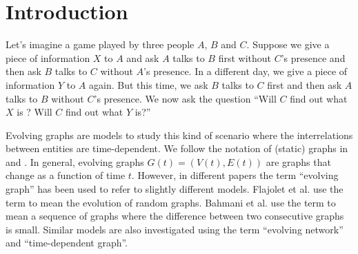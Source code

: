 \documentclass[11pt, conference, , compsocconf]{IEEEtran}
\theoremstyle{definition}
\begin{document}
\section{Introduction}

Let's imagine a game played by three people $A$, $B$ and $C$.
Suppose we give a piece of information $X$ to $A$ and ask 
$A$ talks to $B$ first without $C$'s presence and then ask $B$ talks to $C$ without $A$'s presence.
In a different day, we give a piece of information $Y$ to $A$ again.
But this time, we ask $B$ talks to $C$ first and 
then ask $A$ talks to $B$ without $C$'s presence. 
We now ask the question ``Will $C$ find out what $X$ is ? Will $C$ find out
what $Y$ is?''  

Evolving graphs are models to study this kind of scenario where the 
interrelations between entities are time-dependent.
We follow the notation of (static) graphs in  \cite{even12} and \cite{kegi11}.
In general, evolving graphs $G(t) = (V(t), E(t))$ are graphs that change as a function of time $t$. However, in different papers the term ``evolving graph'' has been
used to refer to slightly different models. 
 Flajolet et al. \cite{fkp89} use the term to mean the evolution of random graphs.
Bahmani et al. \cite{bkmu12} use the term to mean a sequence of graphs where
the difference between two consecutive graphs is small.
Similar models are also investigated using the term ``evolving network'' and 
``time-dependent graph''. 
\end{document}
